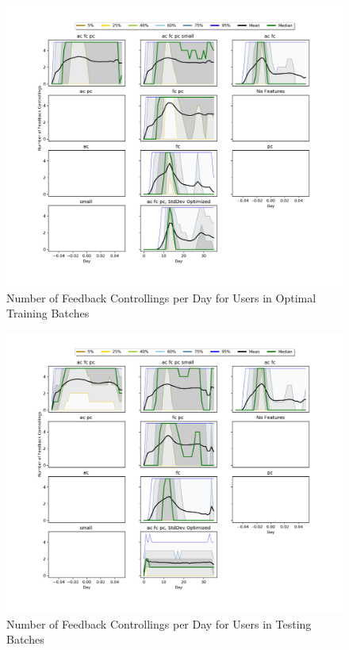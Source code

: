 	\begin{figure}[H]
	\includegraphics[width=1.5\textwidth,center]{figures/QM9train.png}%
	\caption{Number of Feedback Controllings per Day for Users in Optimal Training Batches}
	\label{QM9train}
	\end{figure}

	\begin{figure}[H]
	\includegraphics[width=1.5\textwidth,center]{figures/QM9test.png}%
	\caption{Number of Feedback Controllings per Day for Users in Testing Batches}
	\label{QM9test}
	\end{figure}

